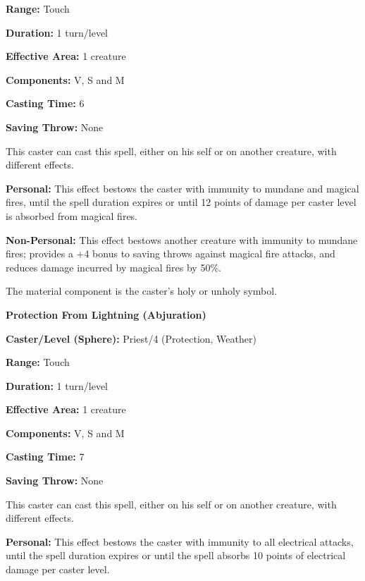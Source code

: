 \begin{multicols}{2}
\begin{minipage}{\columnwidth}
\noindent \textbf{Range:} Touch

\noindent \textbf{Duration:} 1 turn/level

\noindent \textbf{Effective Area:} 1 creature

\noindent \textbf{Components:} V, S and M

\noindent \textbf{Casting Time:} 6

\noindent \textbf{Saving Throw:} None

\end{minipage}

This caster can cast this spell, either on his self or on another creature, with different effects. 

\textbf{Personal:} This effect bestows the caster with immunity to mundane and magical fires, until the spell duration expires or until 12 points of damage per caster level is absorbed from magical fires.

\textbf{Non-Personal:} This effect bestows another creature with immunity to mundane fires; provides a +4 bonus to saving throws against magical fire attacks, and reduces damage incurred by magical fires by 50\%.

The material component is the caster's holy or unholy symbol.

\vspace{1em}

\noindent
\begin{minipage}{\columnwidth}

\noindent \textbf{Protection From Lightning (Abjuration)} 

\noindent \textbf{Caster/Level (Sphere):} Priest/4 (Protection, Weather)

\noindent \textbf{Range:} Touch

\noindent \textbf{Duration:} 1 turn/level

\noindent \textbf{Effective Area:} 1 creature

\noindent \textbf{Components:} V, S and M

\noindent \textbf{Casting Time:} 7

\noindent \textbf{Saving Throw:} None

\end{minipage}

This caster can cast this spell, either on his self or on another creature, with different effects. 

\textbf{Personal:} This effect bestows the caster with immunity to all electrical attacks, until the spell duration expires or until the spell absorbs 10 points of electrical damage per caster level.


\end{multicols}
